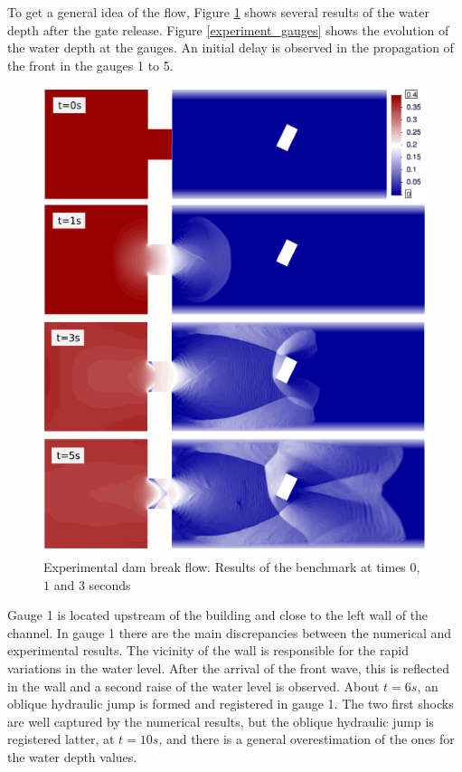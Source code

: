 To get a general idea of the flow, Figure \ref{experiment_plots} shows several results of the water depth after the gate release. Figure \ref{experiment_gauges} shows the evolution of the water depth at the gauges. An initial delay is observed in the propagation of the front in the gauges 1 to 5.

\begin{figure}
\centering
\includegraphics[width=\textwidth]{img/eulerian/exp/results.png}
\caption{Experimental dam break flow. Results of the benchmark at times $0$, $1$ and $3$ seconds}
\label{experiment_plots}
\end{figure}


Gauge 1 is located upstream of the building and close to the left wall of the channel. In gauge 1 there are the main discrepancies between the numerical and experimental results. The vicinity of the wall is responsible for the rapid variations in the water level. After the arrival of the front wave, this is reflected in the wall and a second raise of the water level is observed. About $t=6s$, an oblique hydraulic jump is formed and registered in gauge 1. The two first shocks are well captured by the numerical results, but the oblique hydraulic jump is registered latter, at $t=10s$, and there is a general overestimation of the ones for the water depth values.

